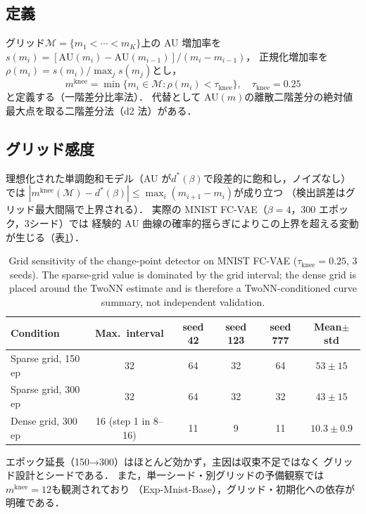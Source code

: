 \documentclass[11pt,a4paper]{jsarticle}
\newcommand{\mknee}{m^{\mathrm{knee}}}
\newcommand{\dstar}{d^{*}(\beta)}
\begin{document}
\subsection{定義}

グリッド$\mathcal{M} = \{m_1 < \cdots < m_K\}$上の AU 増加率を
$s(m_i) = [\mathrm{AU}(m_i) - \mathrm{AU}(m_{i-1})] / (m_i - m_{i-1})$，
正規化増加率を$\rho(m_i) = s(m_i) / \max_j s(m_j)$とし，
\begin{equation}
  \mknee = \min\{m_i \in \mathcal{M} : \rho(m_i) < \tau_{\mathrm{knee}}\},
  \quad \tau_{\mathrm{knee}} = 0.25
  \label{eq:mknee}
\end{equation}
と定義する（一階差分比率法）．
代替として AU$(m)$の離散二階差分の絶対値最大点を取る二階差分法（d2 法）がある．

\subsection{グリッド感度}

理想化された単調飽和モデル（AU が$\dstar$で段差的に飽和し，ノイズなし）では
$|\mknee(\mathcal{M}) - \dstar| \leq \max_i (m_{i+1} - m_i)$が成り立つ
（検出誤差はグリッド最大間隔で上界される）．
実際の MNIST FC-VAE（$\beta = 4$，300 エポック，3シード）では
経験的 AU 曲線の確率的揺らぎによりこの上界を超える変動が生じる（表\ref{tab:knee_grid}）．

\begin{table}[H]
\centering
\caption{Grid sensitivity of the change-point detector on MNIST FC-VAE
($\tau_{\mathrm{knee}} = 0.25$, 3 seeds). The sparse-grid value is dominated
by the grid interval; the dense grid is placed around the TwoNN estimate and
is therefore a TwoNN-conditioned curve summary, not independent validation.}
\label{tab:knee_grid}
\small
\begin{tabular}{lccccc}
\toprule
Condition & Max.\ interval & seed 42 & seed 123 & seed 777 & Mean$\pm$std \\
\midrule
Sparse grid, 150 ep & 32 & 64 & 32 & 64 & $53 \pm 15$ \\
Sparse grid, 300 ep & 32 & 64 & 32 & 32 & $43 \pm 15$ \\
Dense grid, 300 ep & 16 (step 1 in 8--16) & 11 & 9 & 11 & $10.3 \pm 0.9$ \\
\bottomrule
\end{tabular}
\end{table}

エポック延長（150→300）はほとんど効かず，主因は収束不足ではなく
グリッド設計とシードである．
また，単一シード・別グリッドの予備観察では$\mknee = 12$も観測されており
（Exp-Mnist-Base），グリッド・初期化への依存が明確である．
\end{document}
